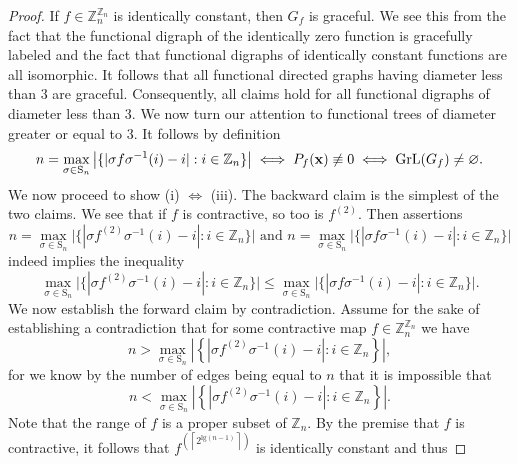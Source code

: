 \begin{proof}
If $f\in\mathbb{Z}_{n}^{\mathbb{Z}_{n}}$ is identically constant,
then $G_{f}$ is graceful. We see this from the fact that the functional
digraph of the identically zero function is gracefully labeled and the fact that
functional digraphs of identically constant functions are all isomorphic. It follows
that all functional directed graphs having diameter less than $3$ are graceful. Consequently,
all claims hold for all functional digraphs of diameter less than $3$. We now turn our attention
to functional trees of diameter greater or equal to $3$. 
It follows by definition 
\begin{equation}
n=\max_{\sigma\in\text{S}_{n}}\big|\{|\sigma f\sigma^{-1}(i)-i|:i\in\mathbb{Z}_{n}\}\big|\iff P_{f}({\bf x})\not\equiv0\iff\text{GrL}(G_{f})\neq\varnothing.
\end{equation}
We now proceed to show (i) $\iff$ (iii). The backward claim is the simplest of the two claims. We see
that if $f$ is contractive, so too is $f^{(2)}$. Then 
assertions
\begin{equation}
n=\max_{\sigma\in\text{S}_{n}}\big|\{|\sigma f^{(2)}\sigma^{-1}(i)-i|:i\in\mathbb{Z}_{n}\}\big|\text{  and  }n=\max_{\sigma\in\text{S}_{n}}\big|\{|\sigma f\sigma^{-1}(i)-i|:i\in\mathbb{Z}_{n}\}\big|
\end{equation}
indeed implies the inequality
\begin{equation}
\max_{\sigma\in\text{S}_{n}}\big|\{|\sigma f^{(2)}\sigma^{-1}(i)-i|:i\in\mathbb{Z}_{n}\}\big|\le\max_{\sigma\in\text{S}_{n}}\big|\{|\sigma f\sigma^{-1}(i)-i|:i\in\mathbb{Z}_{n}\}\big|.
\end{equation}
We now establish the forward claim by contradiction. Assume for the
sake of establishing a contradiction that for some contractive map
$f\in\mathbb{Z}_{n}^{\mathbb{Z}_{n}}$ we have 
\begin{equation}
n>\max_{\sigma\in\text{S}_{n}}\left|\left\{ |\sigma f^{(2)}\sigma^{-1}(i)-i|:i\in\mathbb{Z}_{n}\right\} \right|,
\end{equation}
for we know by the number of edges being equal to $n$ that it is impossible
 that 
\begin{equation}
n<\max_{\sigma\in\text{S}_{n}}\left|\left\{ |\sigma f^{(2)}\sigma^{-1}(i)-i|:i\in\mathbb{Z}_{n}\right\} \right|.
\end{equation}
Note that the range of $f$ is a proper subset of $\mathbb{Z}_{n}$.
By the premise that $f$ is contractive, it follows that $f^{(\left\lceil 2^{\text{lg}(n-1)}\right\rceil )}$
is identically constant and thus 

\end{proof}
